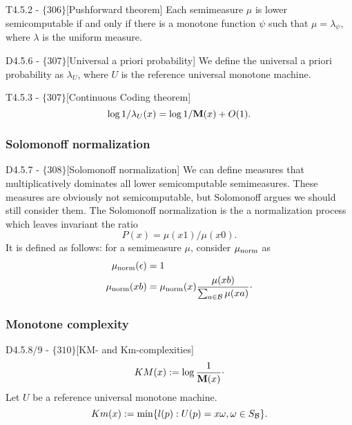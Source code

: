 \documentclass{article}
\begin{document}
\begin{flexitheorem}{T4.5.2 - $\{306\}$}[Pushforward theorem]
    Each semimeasure $\mu$ is lower semicomputable if and only if there is a monotone function $\psi$ such that $\mu = \lambda_\psi$, where $\lambda$ is the uniform measure.
\end{flexitheorem}

\begin{flexidefinition}{D4.5.6 - $\{307\}$}[Universal a priori probability]
    We define the universal a priori probability as $\lambda_U$, where $U$ is the reference universal monotone machine.
\end{flexidefinition}

\begin{flexitheorem}{T4.5.3 - $\{307\}$}[Continuous Coding theorem]
    \begin{equation}
        \log 1/ \lambda_U(x) = \log 1/{\bf M}(x) + O(1).
    \end{equation}
\end{flexitheorem}

\subsubsection{Solomonoff normalization}

\begin{flexidefinition}{D4.5.7 - $\{308\}$}[Solomonoff normalization]
    We can define measures that multiplicatively dominates all lower semicomputable semimeasures. These measures are obviously not semicomputable, but Solomonoff argues we should still consider them. The Solomonoff normalization is the a normalization process which leaves invariant the ratio 
    \begin{equation}
        P(x) = \mu(x1)/\mu(x0).
    \end{equation}
    It is defined as follows: for a semimeasure $\mu$, consider $\mu_{\operatorname{norm}}$ as 
    \begin{align}
        \mu_{\operatorname{norm}}(\epsilon) &= 1\\
        \mu_{\operatorname{norm}}(xb) &= \mu_{\operatorname{norm}} (x) \frac{\mu (xb)}{\sum_{a \in \mathcal{B}} \mu (x a)}\cdot
    \end{align}
\end{flexidefinition}

\subsubsection{Monotone complexity}

\begin{flexidefinition}{D4.5.8/9 - $\{310\}$}[KM- and Km-complexities]
    \begin{equation}
        KM(x) := \log \frac{1}{{\bf M}(x)}\cdot
    \end{equation}
Let $U$ be a reference universal monotone machine.
\begin{equation}
    Km(x) := \min \{ l(p) : U(p) =x\omega, \omega \in S_{\mathcal{B}}\}.
\end{equation}
\end{flexidefinition}
\end{document}
